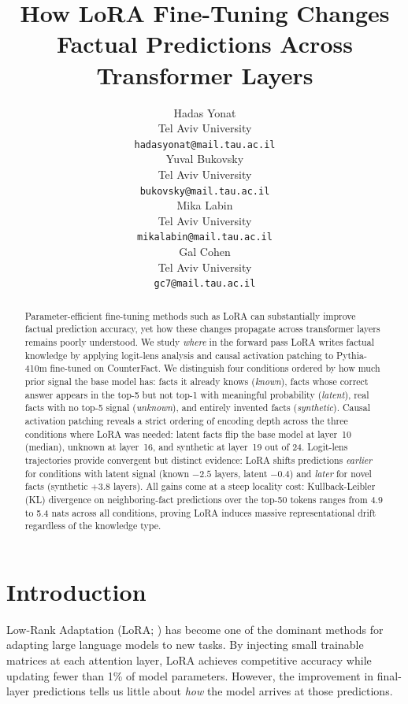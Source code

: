 \documentclass[11pt]{article}
\title{How LoRA Fine-Tuning Changes Factual Predictions Across Transformer Layers}
\author{
  Hadas Yonat \\
  Tel Aviv University \\
  \texttt{hadasyonat@mail.tau.ac.il} \\\And
  Yuval Bukovsky \\
  Tel Aviv University \\
  \texttt{bukovsky@mail.tau.ac.il} \\\AND
  Mika Labin \\
  Tel Aviv University \\
  \texttt{mikalabin@mail.tau.ac.il} \\\And
  Gal Cohen \\
  Tel Aviv University \\
  \texttt{gc7@mail.tau.ac.il}
}
\begin{document}
\maketitle

\begin{abstract}
Parameter-efficient fine-tuning methods such as LoRA can substantially improve
factual prediction accuracy, yet how these changes propagate across transformer
layers remains poorly understood.
We study \emph{where} in the forward pass LoRA writes factual knowledge by
applying logit-lens analysis and causal activation patching to Pythia-410m
fine-tuned on CounterFact.
We distinguish four conditions ordered by how much prior signal the base model
has: facts it already knows (\emph{known}), facts whose correct answer appears
in the top-5 but not top-1 with meaningful probability (\emph{latent}), real
facts with no top-5 signal (\emph{unknown}), and entirely invented facts
(\emph{synthetic}).
Causal activation patching reveals a strict ordering of encoding depth across
the three conditions where LoRA was needed: latent facts flip the base model
at layer~10 (median), unknown at layer~16, and synthetic at layer~19 out of 24.
Logit-lens trajectories provide convergent but distinct evidence: LoRA shifts
predictions \emph{earlier} for conditions with latent signal (known $-2.5$
layers, latent $-0.4$) and \emph{later} for novel facts (synthetic $+3.8$
layers).
All gains come at a steep locality cost: Kullback-Leibler (KL) divergence on 
neighboring-fact predictions over the top-50 tokens ranges from 4.9 to 5.4 nats 
across all conditions, proving LoRA induces massive representational drift 
regardless of the knowledge type.
\end{abstract}

\section{Introduction}

Low-Rank Adaptation (LoRA; \citealt{hu2022lora}) has become one of the
dominant methods for adapting large language models to new tasks.
By injecting small trainable matrices at each attention layer, LoRA achieves
competitive accuracy while updating fewer than 1\% of model parameters.
However, the improvement in final-layer predictions tells us little about
\emph{how} the model arrives at those predictions.
\end{document}
